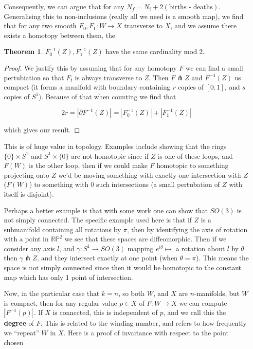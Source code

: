 \documentclass{article}
\theoremstyle{definition}
\newtheorem{theorem}{Theorem}
\begin{document}
Consequently, we can argue that for any $N_f = N_i + 2(\text{births - deaths})$.
Generalising this to non-inclusions (really all we need is a smooth map), we
find that for any two smooth $F_0, F_1 : W \to X$ transverse to $X$, and we
assume there exists a homotopy between them, the

\begin{theorem}
  $F_0^{-1}(Z), F_1^{-1}(Z)$ have the same cardinality mod 2.
\end{theorem}

\begin{proof}
We justify this by assuming that for any homotopy $F$ we can find a small
pertubiation so that $F_t$ is always transverse to $Z.$ Then $F \pitchfork Z$
and $F^{-1}(Z)$ us compact (it forms a manifold with boundary containing $r$
copies of $[0, 1]$, and $s$ copies of $S^1$). Because of that when counting we
find that

$$ 2r = |\partial F^{-1}(Z)| = |F_0^{-1}(Z)| + |F_1^{-1}(Z)| $$

which gives our result.
\end{proof}

This is of huge value in topology. Examples include showing that the rings $\{0\}
\times S^1$ and $S^1 \times \{0\}$ are not homotopic since if $Z$ is one of
these loops, and $F(W)$ is the other loop, then if we could make $F$ homotopic
to something projecting onto $Z$ we'd be moving something with exactly one
intersection with $Z$ ($F(W)$) to something with 0 such intersections (a small
pertubation of $Z$ with itself is disjoint).

Perhaps a better example is that with some work one can show that $SO(3)$ is not
simply connected. The specific example used here is that if $Z$ is a submanifold
containing all rotations by $\pi$, then by identifying the axis of rotation with
a point in $\mathbb{RP}^2$ we see that these spaces are diffeomorphic. Then if
we consider any axis $l$, and $\gamma : S^1 \to SO(3)$ mapping $e^{i\theta}
\mapsto $ a rotation about $l$ by $\theta$ then $\gamma \pitchfork Z$, and they
intersect exactly at one point (when $\theta = \pi$). This means the space is
not simply connected since then it would be homotopic to the constant map which
has only 1 point of intersection.

Now, in the particular case that $k=n$, so both $W$, and $X$ are $n$-manifolds,
but $W$ is compact, then for any regular value $p \in X$ of $F : W \to X$ we can
compute $|F^{-1}(p)|$. If $X$ is connected, this is independent of $p$, and we
call this the \textbf{degree} of $F$. This is related to the winding number, and
refers to how frequently we ``repeat'' $W$ in $X$. Here is a proof of invariance
with respect to the point chosen
\end{document}
